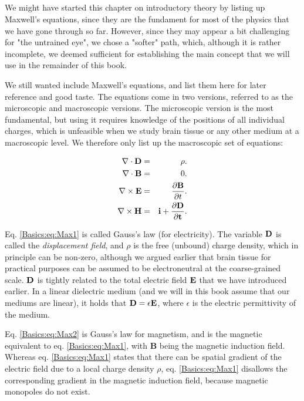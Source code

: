 

\subsection{}
We might have started this chapter on introductory theory by listing up Maxwell's equations, since they are the fundament for most of the physics that we have gone through so far. However, since they may appear a bit challenging for "the untrained eye", we chose a "softer" path, which, although it is rather incomplete, we deemed sufficient for establishing the main concept that we will use in the remainder of this book. 

We still wanted include Maxwell's equations, and list them here for later reference and good taste.
The equations come in two versions, referred to as the microscopic and macroscopic versions. The microscopic version is the most fundamental, but using it requires knowledge of the positions of all individual charges, which is unfeasible when we study brain tissue or any other medium at a macroscopic level. We therefore only list up the macroscopic set of equations: 

\begin{eqnarray}
\nabla\cdot {\bf D} & = & \rho. \label{Basics:eq:Max1} \\
\nabla \cdot {\bf B} & = & 0.  \label{Basics:eq:Max2} \\
\nabla \times {\bf E} & = & \frac{\partial {\bf B}}{\partial t}.  \label{Basics:eq:Max3} \\
\nabla \times {\bf H} & = & \bf{i} + \frac{\partial {\bf D}}{\partial t}.  \label{Basics:eq:Max4}
\label{Basics:eq:Maxwell}
\end{eqnarray}

Eq. \ref{Basics:eq:Max1} is called Gauss's law (for electricity). The variable ${\bf D}$ is called the \textit{displacement field}, and $\rho$ is the free (unbound) charge density, which in principle can be non-zero, although we argued earlier that brain tissue for practical purposes can be assumed to be electroneutral at the coarse-grained scale. ${\bf D}$ is tightly related to the total electric field ${\bf E}$ that we have introduced earlier. In a linear dielectric medium (and we will in this book assume that our mediums are linear), it holds that ${\bf D} = \epsilon {\bf E}$, where $\epsilon$ is the electric permittivity of the medium. 

Eq. \ref{Basics:eq:Max2} is Gauss's law for magnetism, and is the magnetic equivalent to eq. \ref{Basics:eq:Max1}, with {\bf B} being the magnetic induction field.  Whereas eq. \ref{Basics:eq:Max1} states that there can be spatial gradient of the electric field due to a local charge density $\rho$, eq. \ref{Basics:eq:Max1} disallows the corresponding gradient in the magnetic induction field, because magnetic monopoles do not exist. 

